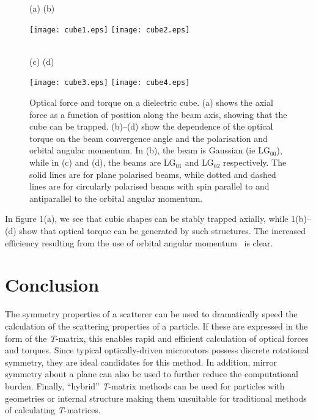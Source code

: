 \documentclass{article}
\begin{document}
\begin{figure}[!h]
(a) \hspace{0.47\columnwidth} (b) \\
\centerline{\texttt{[image: cube1.eps]}
\texttt{[image: cube2.eps]}} \\
(c)  \hspace{0.47\columnwidth} (d) \\
\centerline{\texttt{[image: cube3.eps]}
\texttt{[image: cube4.eps]}} 
\caption{Optical force and torque on a dielectric cube. (a) shows the
axial force as a function of position along the beam axis, showing that
the cube can be trapped. (b)--(d) show the dependence of the optical
torque on the beam convergence angle and the polarisation and orbital
angular momentum. In (b), the beam is Gaussian (ie LG$_{00}$), while in
(c) and (d), the beams are LG$_{01}$ and LG$_{02}$ respectively.
The solid lines are for plane polarised beams, while dotted and dashed
lines are for circularly polarised beams with spin parallel to and
antiparallel to the orbital angular momentum.}
\label{fig1}
\end{figure}

In figure 1(a), we see that cubic shapes can be stably trapped axially,
while 1(b)--(d) show that optical torque can be generated by such
structures. The increased efficiency resulting from the use of 
orbital angular momentum~\cite{nieminen2004d} is clear.

\section{Conclusion}

The symmetry properties of a scatterer can be used to dramatically speed
the calculation of the scattering properties of a particle. If these
are expressed in the form of the \textit{T}-matrix, this enables rapid and
efficient calculation of optical forces and torques. Since typical
optically-driven microrotors possess discrete rotational symmetry, they are
ideal candidates for this method. In addition, mirror symmetry about
a plane can also be used to further reduce the computational burden.
Finally, ``hybrid'' \textit{T}-matrix methods can be used for particles
with geometries or internal structure making them unsuitable for
traditional methods of calculating \textit{T}-matrices.
\end{document}
